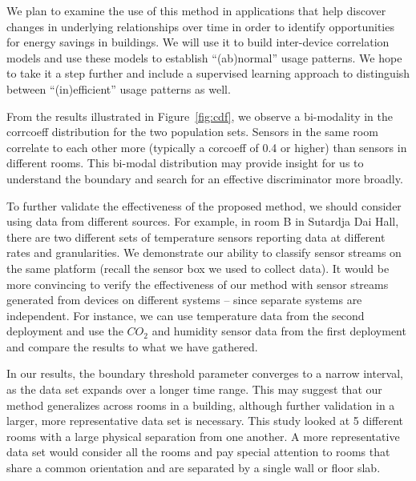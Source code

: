 We plan to examine the use of this method in applications that help discover changes in underlying relationships over time
in order to identify opportunities for energy savings in buildings.  We will use it to build inter-device correlation models
and use these models to establish ``(ab)normal'' usage patterns.  We hope to take it a step further and include a
supervised learning approach to distinguish between ``(in)efficient'' usage patterns as well.


From the results illustrated in Figure~\ref{fig:cdf}, we observe a bi-modality in the corrcoeff 
distribution for the two population sets.  Sensors in the same room correlate to each other more (typically a corcoeff of 0.4 or higher)
than sensors in different rooms.  %
This bi-modal distribution may provide insight for us to 
understand the boundary and search for an effective discriminator more broadly.

To further validate the effectiveness of the proposed method, we should consider using data from different sources.
For example, in room B in Sutardja Dai Hall, there are two different sets of temperature sensors reporting data at different rates and granularities.
We demonstrate our ability to classify sensor streams on the same platform (recall the sensor box we used to collect data). 
It would be more convincing to verify the effectiveness of our method with sensor streams generated from devices on
 different systems -- since separate systems are independent.  For instance, we can use temperature data from the second deployment 
 and use the $CO_{2}$ and humidity sensor data from the first deployment and compare the results to what we have gathered.

In our results, the boundary threshold parameter converges to a narrow interval, as the data set expands 
over a longer time range.  This may suggest that our method generalizes across rooms in a building, although further validation in a 
larger, more representative data set is necessary.  This study looked at 5 different rooms with a large physical separation from one
another.  A more representative data set would consider all the rooms and pay special attention to rooms that share a common orientation
and are separated by a single wall or floor slab.
  
